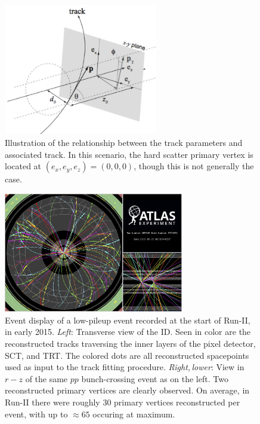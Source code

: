 \begin{figure}[!htb]
    \begin{center}
        \includegraphics[width=0.6\textwidth]{figures/chapter3/perigee_params}
        \caption{
            Illustration of the relationship between the track parameters and associated track.
            In this scenario, the hard scatter primary vertex is located
            at $(e_x, e_y, e_z) = (0,0,0)$, though this is not generally the case.
        }
        \label{fig:track_params}
    \end{center}
\end{figure}

\begin{figure}[!htb]
    \begin{center}
        \includegraphics[width=0.7\textwidth]{figures/chapter3/event_display_tracking_vertexing}
        \caption{
            Event display of a low-pileup event recorded at the start of Run-II, in early 2015.
            \textit{Left}: Transverse view of the ID. Seen in color are the reconstructed tracks traversing
                the inner layers of the pixel detector, SCT, and TRT. The colored dots are all reconstructed
                spacepoints used as input to the track fitting procedure.
            \textit{Right,\,lower}: View in $r-z$ of the same $pp$ bunch-crossing event as on the left.
                Two reconstructed primary vertices are clearly observed.
                On average, in Run-II there were roughly 30 primary vertices reconstructed per event, with
                up to $\approx65$ occuring at maximum.
        }
        \label{fig:id_event_display}
    \end{center}
\end{figure}
\FloatBarrier

